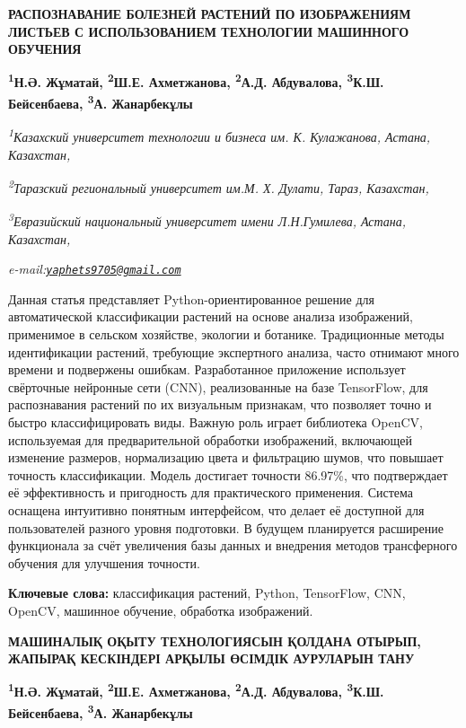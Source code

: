 \begin{articleheader}
{\bfseries РАСПОЗНАВАНИЕ БОЛЕЗНЕЙ РАСТЕНИЙ ПО ИЗОБРАЖЕНИЯМ ЛИСТЬЕВ С ИСПОЛЬЗОВАНИЕМ ТЕХНОЛОГИИ МАШИННОГО ОБУЧЕНИЯ}

{\bfseries
\textsuperscript{1}Н.Ә. Жұматай,
\textsuperscript{2}Ш.Е. Ахметжанова,
\textsuperscript{2}А.Д. Абдувалова,
\textsuperscript{3}К.Ш. Бейсенбаева,
\textsuperscript{3}А. Жанарбекұлы\textsuperscript{\envelope }}
\end{articleheader}

\begin{affiliation}
\emph{\textsuperscript{1}Казахский университет технологии и бизнеса им. К. Кулажанова, Астана, Казахстан,}

\emph{\textsuperscript{2}Таразский региональный университет им.М. Х. Дулати, Тараз, Казахстан,}

\emph{\textsuperscript{3}Евразийский национальный университет имени Л.Н.Гумилева, Астана, Казахстан,}

\emph{e-mail:\href{mailto:yaphets9705@gmail.com}{\nolinkurl{yaphets9705@gmail.com}}}
\end{affiliation}

Данная статья представляет Python-ориентированное решение для
автоматической классификации растений на основе анализа изображений,
применимое в сельском хозяйстве, экологии и ботанике. Традиционные
методы идентификации растений, требующие экспертного анализа, часто
отнимают много времени и подвержены ошибкам. Разработанное приложение
использует свёрточные нейронные сети (CNN), реализованные на базе
TensorFlow, для распознавания растений по их визуальным признакам, что
позволяет точно и быстро классифицировать виды. Важную роль играет
библиотека OpenCV, используемая для предварительной обработки
изображений, включающей изменение размеров, нормализацию цвета и
фильтрацию шумов, что повышает точность классификации. Модель достигает
точности 86.97\%, что подтверждает её эффективность и пригодность для
практического применения. Система оснащена интуитивно понятным
интерфейсом, что делает её доступной для пользователей разного уровня
подготовки. В будущем планируется расширение функционала за счёт
увеличения базы данных и внедрения методов трансферного обучения для
улучшения точности.

{\bfseries Ключевые слова:} классификация растений, Python, TensorFlow,
CNN, OpenCV, машинное обучение, обработка изображений.

\begin{articleheader}
{\bfseries МАШИНАЛЫҚ ОҚЫТУ ТЕХНОЛОГИЯСЫН ҚОЛДАНА ОТЫРЫП, ЖАПЫРАҚ КЕСКІНДЕРІ АРҚЫЛЫ ӨСІМДІК АУРУЛАРЫН ТАНУ}

{\bfseries
\textsuperscript{1}Н.Ә. Жұматай,
\textsuperscript{2}Ш.Е. Ахметжанова,
\textsuperscript{2}А.Д. Абдувалова,
\textsuperscript{3}К.Ш. Бейсенбаева,
\textsuperscript{3}А. Жанарбекұлы\textsuperscript{\envelope }}
\end{articleheader}

